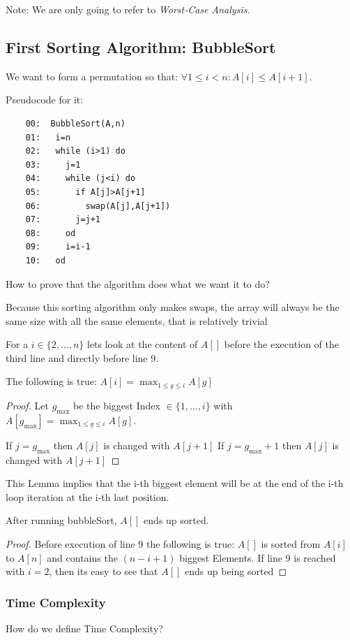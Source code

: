 Note: We are only going to refer to \emph{Worst-Case Analysis}.

\subsection{First Sorting Algorithm: BubbleSort}
We want to form a permutation so that: $\forall 1\leq i<n: A[i]\leq A[i+1]$.

Pseudocode for it:
\begin{verbatim}
	00:  BubbleSort(A,n)
	01:   i=n
	02:   while (i>1) do
	03:     j=1
	04:     while (j<i) do
	05:       if A[j]>A[j+1]
	06:         swap(A[j],A[j+1])
	07:       j=j+1
	08:     od
	09:     i=i-1
	10:   od
\end{verbatim}
How to prove that the algorithm does what we want it to do?

Because this sorting algorithm only makes swaps, the array will always be the same size with all the same elements, that is relatively trivial

\begin{lem}
For a $i \in \{2,\dots,n\}$ lets look at the content of $A[]$ before the execution of the third line and directly before line 9.

The following is true: $A[i]=\max_{1\leq g \leq i} A[g]$
\end{lem}

\begin{proof}[Proof]
Let $g_{\max}$ be the biggest Index $\in \{1, \dots, i\}$ with 
	$A[g_{\max}]=\max_{1\leq g \leq i} A[g]$.

If $j=g_{\max}$ then $A[j]$ is changed with $A[j+1]$ 
If $j=g_{\max}+1$ then $A[j]$ is changed with $A[j+1]$ 
\end{proof}

This Lemma implies that the i-th biggest element will be at the end of the i-th loop iteration at the i-th last position.

\begin{thm}
After running bubbleSort, $A[]$ ends up sorted.
\end{thm}
\begin{proof}[Proof]
Before execution of line 9 the following is true: $A[]$ is sorted from $A[i]$ to $A[n]$ and contains the $(n-i+1)$ biggest Elements.
If line 9 is reached with $i=2$, then its easy to see that $A[]$ ends up being sorted
\end{proof}

\subsubsection{Time Complexity}
How do we define Time Complexity?

